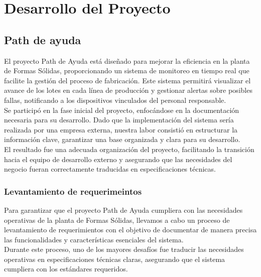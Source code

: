 \documentclass[12pt,letterpaper,spanish, xcolor=table]{report}
\numberwithin{figure}{subsection}
\begin{document}


\chapter{Desarrollo del Proyecto}
\newpage
	
\section{Path de ayuda}

	El proyecto Path de Ayuda está diseñado para mejorar la eficiencia en la planta de Formas Sólidas, proporcionando un sistema de monitoreo en tiempo real que facilite la gestión del proceso de fabricación. Este sistema permitirá visualizar el avance de los lotes en cada línea de producción y gestionar alertas sobre posibles fallas, notificando a los dispositivos vinculados del personal responsable.\\
	
	Se participó en la fase inicial del proyecto, enfocándose en la documentación necesaria para su desarrollo. Dado que la implementación del sistema sería realizada por una empresa externa, nuestra labor consistió en estructurar la información clave, garantizar una base organizada y clara para su desarrollo.\\
	
	El resultado fue una adecuada organización del proyecto, facilitando la transición hacia el equipo de desarrollo externo y asegurando que las necesidades del negocio fueran correctamente traducidas en especificaciones técnicas.

\subsection{Levantamiento de requerimeintos}

	Para garantizar que el proyecto Path de Ayuda cumpliera con las necesidades operativas de la planta de Formas Sólidas, llevamos a cabo un proceso de levantamiento de requerimientos con el objetivo de documentar de manera precisa las funcionalidades y características esenciales del sistema.\\
	
	Durante este proceso, uno de los mayores desafíos fue traducir las necesidades operativas en especificaciones técnicas claras, asegurando que el sistema cumpliera con los estándares requeridos.\\
	
\end{document}
